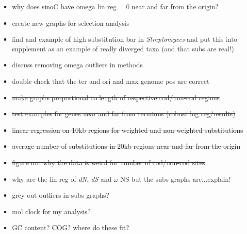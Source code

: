 \documentclass[12pt]{article}
\newcommand{\strep}{\textit{Streptomyces}\xspace}
\newcommand{\dn}{\textit{dN}\xspace}
\newcommand{\ds}{\textit{dS}\xspace}
\begin{document}
\begin{itemize}
%		

    \item why does sinoC have omega lin reg = 0 near and far from the origin?
    
    \item create new graphs for selection analysis
    
    \item find and example of high substitution bar in \strep and put this into supplement as an example of really diverged taxa (and that subs are real!)
    
    \item discuss removing omega outliers in methods
    
    \item double check that the ter and ori and max genome pos are correct
	
	\item \sout{make graphs proportional to length of respective cod/non-cod regions}
	
	\item \sout{test examples for genes near and far from terminus (robust log reg/results)}
	
	\item \sout{linear regression on 10kb regions for weighted and non-weighted substitutions}
	
	\item \sout{average number of substitutions in 20kb regions near and far from the origin}
	
	\item \sout{figure out why the data is weird for number of cod/non-cod sites}
	
	\item why are the lin reg of \dn, \ds and $\omega$ NS but the subs graphs are...explain!
	
	\item \sout{grey out outliers in subs graphs?}
	
	\item mol clock for my analysis?
	
	\item GC content? COG? where do these fit?
	
\end{itemize}
\end{document}
